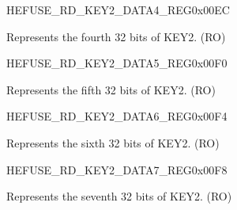 \begin{register}{H}{EFUSE\_RD\_KEY2\_DATA4\_REG}{0x00EC}\label{regdesc:EFUSERDKEY2DATA4REG}
%
\regnewline%
\begin{regdesc}\begin{reglist}
\label{fielddesc:EFUSEKEY2DATA4}\item [EFUSE\_KEY2\_DATA4] Represents the fourth 32 bits of KEY2. (RO)
\end{reglist}\end{regdesc}
\end{register}


\begin{register}{H}{EFUSE\_RD\_KEY2\_DATA5\_REG}{0x00F0}\label{regdesc:EFUSERDKEY2DATA5REG}
%
\regnewline%
\begin{regdesc}\begin{reglist}
\label{fielddesc:EFUSEKEY2DATA5}\item [EFUSE\_KEY2\_DATA5] Represents the fifth 32 bits of KEY2. (RO)
\end{reglist}\end{regdesc}
\end{register}


\begin{register}{H}{EFUSE\_RD\_KEY2\_DATA6\_REG}{0x00F4}\label{regdesc:EFUSERDKEY2DATA6REG}
%
\regnewline%
\begin{regdesc}\begin{reglist}
\label{fielddesc:EFUSEKEY2DATA6}\item [EFUSE\_KEY2\_DATA6] Represents the sixth 32 bits of KEY2. (RO)
\end{reglist}\end{regdesc}
\end{register}


\begin{register}{H}{EFUSE\_RD\_KEY2\_DATA7\_REG}{0x00F8}\label{regdesc:EFUSERDKEY2DATA7REG}
%
\regnewline%
\begin{regdesc}\begin{reglist}
\label{fielddesc:EFUSEKEY2DATA7}\item [EFUSE\_KEY2\_DATA7] Represents the seventh 32 bits of KEY2. (RO)
\end{reglist}\end{regdesc}
\end{register}


